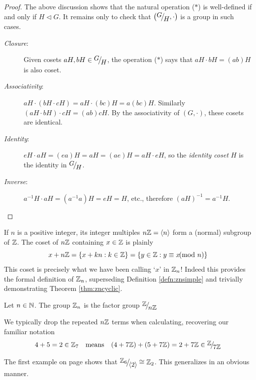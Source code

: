 \begin{proof}
	The above discussion shows that the natural operation ($\ast$) is well-defined if and only if $H\triangleleft G$. It remains only to check that $\left(\quotient GH,\cdot\right)$ is a group in such cases.
	\begin{description}
		\item[\normalfont\emph{Closure}:] Given cosets $aH,bH\in\quotient GH$,  the operation ($\ast$) says that $aH\cdot bH=(ab)H$ is also coset.
		\item[\normalfont\emph{Associativity}:] $aH\cdot(bH\cdot cH)=aH\cdot(bc)H=a(bc)H$. Similarly $(aH\cdot bH)\cdot cH=(ab)cH$. By the associativity of $(G,\cdot)$, these cosets are identical.
		\item[\normalfont\emph{Identity}:] $eH\cdot aH=(ea)H=aH=(ae)H=aH\cdot eH$, so the \emph{identity coset} $H$ is the identity in $\quotient GH$.
		\item[\normalfont\emph{Inverse}:] $a^{-1}H\cdot aH=(a^{-1}a)H=eH=H$, etc., therefore $(aH)^{-1}=a^{-1}H$.\qedhere
	\end{description}
\end{proof}


\goodbreak



If $n$ is a positive integer, its integer multiples $n\mathbb{Z}=\left\langle n\right\rangle$ form a (normal) subgroup of $\mathbb{Z}$. The coset of $n\mathbb{Z}$ containing $x\in\mathbb{Z}$ is plainly
\[
	x+n\mathbb{Z}=\{x+kn:k\in\mathbb{Z}\}
	=\{y\in\mathbb{Z}:y\equiv x\negthickspace\negthickspace\pmod n\}
\]
This coset is precisely what we have been calling `$x$' in $\mathbb{Z}_n$! Indeed this provides the formal definition of $\mathbb{Z}_n$, superseding Definition \ref{defn:znsimple} and trivially demonstrating Theorem \ref{thm:zncyclic}.

\begin{defn}{}{}
	Let $n\in\mathbb{N}$. The group $\mathbb{Z}_n$ is the factor group $\quotient{\Z}{n\Z}$
\end{defn}

We typically drop the repeated $n\mathbb{Z}$ terms when calculating, recovering our familiar notation
\[
	4+5=2\in\Z_7\quad\text{means}\quad (4+7\Z)+(5+7\Z)=2+7\Z \in\quotient{\Z}{7\Z}
\]


The first example on page \pageref{sec:factor} shows that $\quotient{\Z_6}{\ip 2} \cong\Z_2$. This generalizes in an obvious manner.

